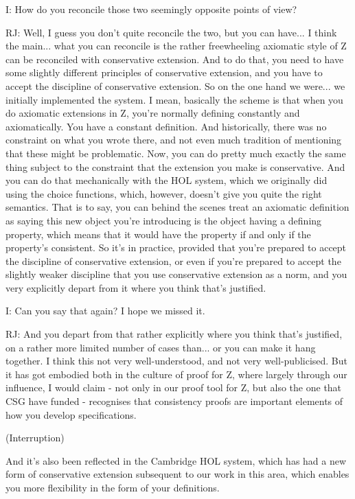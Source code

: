\documentclass[10pt,titlepage]{book}
\begin{document}
I: How do you reconcile those two seemingly opposite points of view?

RJ: Well, I guess you don't quite reconcile the two, but you can have... I think the main... what you can reconcile is the rather freewheeling axiomatic style of Z can be reconciled with conservative extension. And to do that, you need to have some slightly different principles of conservative extension, and you have to accept the discipline of conservative extension. So on the one hand we were... we initially implemented the system. I mean, basically the scheme is that when you do axiomatic extensions in Z, you're normally defining constantly and axiomatically. You have a constant definition. And historically, there was no constraint on what you wrote there, and not even much tradition of mentioning that these might be problematic. Now, you can do pretty much exactly the same thing subject to the constraint that the extension you make is conservative. And you can do that mechanically with the HOL system, which we originally did using the choice functions, which, however, doesn't give you quite the right semantics. That is to say, you can behind the scenes treat an axiomatic definition as saying this new object you're introducing is the object having a defining property, which means that it would have the property if and only if the property's consistent. So it's in practice, provided that you're prepared to accept the discipline of conservative extension, or even if you're prepared to accept the slightly weaker discipline that you use conservative extension as a norm, and you very explicitly depart from it where you think that's justified.

I: Can you say that again? I hope we missed it.

RJ: And you depart from that rather explicitly where you think that's justified, on a rather more limited number of cases than... or you can make it hang together. I think this not very well-understood, and not very well-publicised. But it has got embodied both in the culture of proof for Z, where largely through our influence, I would claim - not only in our proof tool for Z, but also the one that CSG have funded - recognises that consistency proofs are important elements of how you develop specifications.

(Interruption)

And it's also been reflected in the Cambridge HOL system, which has had a new form of conservative extension subsequent to our work in this area, which enables you more flexibility in the form of your definitions.
\end{document}
